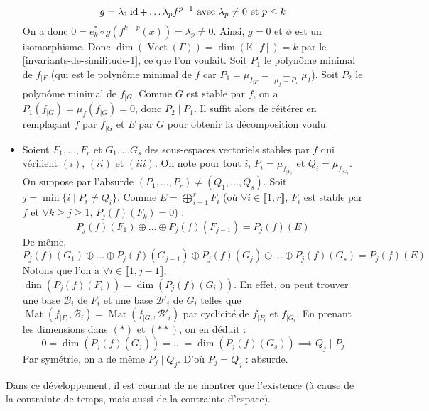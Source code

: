 \begin{demonstration}
\begin{itemize}
			\[ g = \lambda_1 \operatorname{id} + \dots \lambda_p f^{p-1} \text{ avec } \lambda_p \neq 0 \text{ et } p \leq k \]
			On a donc $0 = e_k^* \circ g(f^{k-p} (x)) = \lambda_p \neq 0$. Ainsi, $g = 0$ et $\phi$ est un isomorphisme. Donc $\dim(\operatorname{Vect}(\Gamma)) = \dim(\mathbb{K}[f]) = k$ par le \cref{invariants-de-similitude-1}, ce que l'on voulait.
			\newpar
			Soit $P_1$ le polynôme minimal de $f_{|F}$ (qui est le polynôme minimal de $f$ car $P_1 = \mu_{f_{|F}} = \underset{\mu_f = P_x}{=} \mu_f$). Soit $P_2$ le polynôme minimal de $f_{|G}$. Comme $G$ est stable par $f$, on a $P_1(f_{|G}) = \mu_f(f_{|G}) = 0$, donc $P_2 \mid P_1$. Il suffit alors de réitérer en remplaçant $f$ par $f_{|G}$ et $E$ par $G$ pour obtenir la décomposition voulu.
			\item {} Soient $F_1, \dots, F_r$ et $G_1, \dots G_s$ des sous-espaces vectoriels stables par $f$ qui vérifient $(i)$, $(ii)$ et $(iii)$. On note pour tout $i$, $P_i = \mu_{f_{|F_i}}$ et $Q_i = \mu_{f_{|G_i}}$. On suppose par l'absurde $(P_1, \dots, P_r) \neq (Q_1, \dots, Q_s)$. Soit $j = \min\{ i \mid P_i \neq Q_i \}$.
			Comme $E = \bigoplus_{i = 1}^r F_i$ (où $\forall i \in \llbracket 1, r \rrbracket$, $F_i$ est stable par $f$ et $\forall k \geq j \geq 1$, $P_j(f)(F_k) = 0$) :
			\[ P_j(f)(F_1) \oplus \dots \oplus P_j(f)(F_{j-1}) = P_j(f)(E) \tag{$*$} \]
			De même,
			\[ P_j(f)(G_1) \oplus \dots \oplus P_j(f)(G_{j-1}) \oplus P_j(f)(G_j) \oplus \dots \oplus P_j(f)(G_s) = P_j(f)(E) \tag{$**$} \]
			Notons que l'on a $\forall i \in \llbracket 1, j-1 \rrbracket$, $\dim(P_j(f)(F_i)) = \dim(P_j(f)(G_i))$. En effet, on peut trouver une base $\mathcal{B}_i$ de $F_i$ et une base $\mathcal{B}'_i$ de $G_i$ telles que $\operatorname{Mat}(f_{|F_i}, \mathcal{B}_i) = \operatorname{Mat}(f_{|G_i}, \mathcal{B}'_i)$ par cyclicité de $f_{|F_i}$ et $f_{|G_i}$. En prenant les dimensions dans $(*)$ et $(**)$, on en déduit :
			\[ 0 = \dim(P_j(f)(G_j)) = \dots = \dim(P_j(f)(G_s)) \implies Q_j \mid P_j \]
			Par symétrie, on a de même $P_j \mid Q_j$. D'où $P_j = Q_j$ : absurde.
		\end{itemize}
	\end{demonstration}

	\begin{remark}
		Dans ce développement, il est courant de ne montrer que l'existence (à cause de la contrainte de temps, mais aussi de la contrainte d'espace).
	\end{remark}

